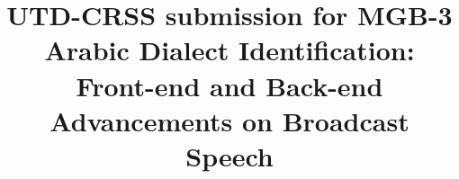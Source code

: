 \documentclass{article}
\title{UTD-CRSS submission for MGB-3 Arabic Dialect Identification: \\ Front-end and Back-end Advancements on Broadcast Speech}
\begin{document}
%
\maketitle
%
\begin{abstract}



\end{abstract}
\end{document}
